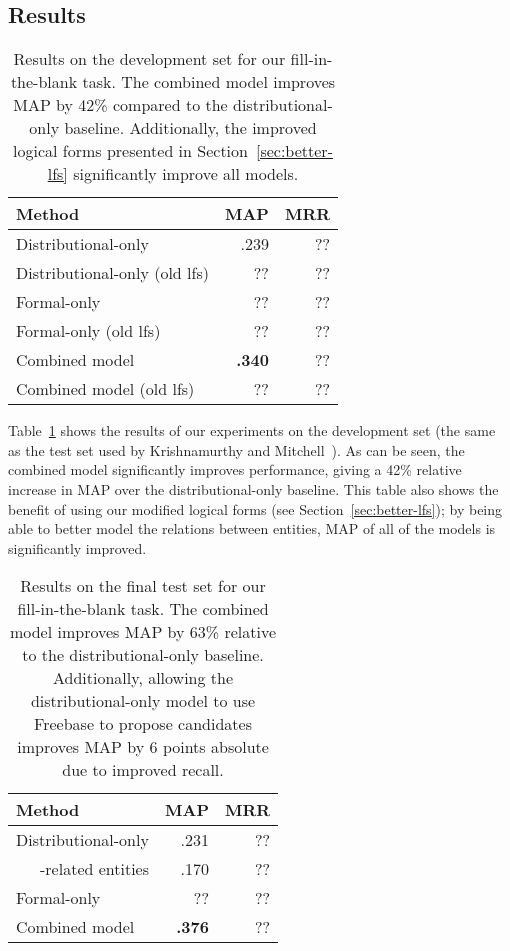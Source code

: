 \documentclass[11pt]{article}
\newcommand{\secref}[1]{Section~\ref{sec:#1}}
\newcommand{\tabref}[1]{Table~\ref{tab:#1}}
\begin{document}
\subsection{Results}

\begin{table}
  \centering
  \begin{tabular}{|l|r|r|}
    \hline
    Method & MAP & MRR \\
    \hline
    Distributional-only & .239 & ?? \\
    Distributional-only (old lfs) & ?? & ?? \\
    \hline
    Formal-only & ?? & ?? \\
    Formal-only (old lfs) & ?? & ?? \\
    \hline
    Combined model & \textbf{.340} & ?? \\
    Combined model (old lfs) & ?? & ?? \\
    \hline
  \end{tabular}
  \caption{Results on the development set for our fill-in-the-blank task.  The
  combined model improves MAP by 42\% compared to the distributional-only
  baseline.  Additionally, the improved logical forms presented in
  \secref{better-lfs} significantly improve all models.}
  \label{tab:dev-results}
\end{table}

\tabref{dev-results} shows the results of our experiments on the development
set (the same as the test set used by Krishnamurthy and
Mitchell~).  As can be
seen, the combined model significantly improves performance, giving a 42\%
relative increase in MAP over the distributional-only baseline.  This table
also shows the benefit of using our modified logical forms (see
\secref{better-lfs}); by being able to better model the relations between
entities, MAP of all of the models is significantly improved.

\begin{table}
  \centering
  \begin{tabular}{|l|r|r|}
    \hline
    Method & MAP & MRR \\
    \hline
    Distributional-only & .231 & ?? \\
    \ \ \ -related entities & .170 & ?? \\
    \hline
    Formal-only & ?? & ?? \\
    \hline
    Combined model & \textbf{.376} & ?? \\
    \hline
  \end{tabular}
  \caption{Results on the final test set for our fill-in-the-blank task.  The
  combined model improves MAP by 63\% relative to the distributional-only
  baseline.  Additionally, allowing the distributional-only model to use
  Freebase to propose candidates improves MAP by 6 points absolute due to
  improved recall.}
  \label{tab:final-results}
\end{table}
\end{document}
